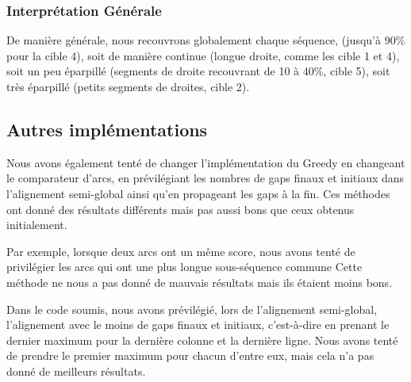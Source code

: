 \FloatBarrier


\subsubsection*{Interprétation Générale}

De manière générale, nous recouvrons globalement chaque séquence, (jusqu'à 90\%
pour la cible 4), soit de manière continue (longue droite, comme les cible 1 et
4), soit un peu éparpillé (segments de droite recouvrant de 10 à 40\%, cible 5),
soit très éparpillé (petits segments de droites, cible 2).

\subsection{Autres implémentations}

Nous avons également tenté de changer l'implémentation du Greedy en changeant
le comparateur d'arcs, en prévilégiant les nombres de gaps finaux et initiaux
dans l'alignement semi-global ainsi qu'en propageant les gaps à la fin. Ces
méthodes ont donné des résultats différents mais pas aussi bons que ceux obtenus
initialement.

Par exemple, lorsque deux arcs ont un même score, nous avons tenté de
privilégier les arcs qui ont une plus longue sous-séquence commune Cette méthode
ne nous a pas donné de mauvais résultats mais ils étaient moins bons.

Dans le code soumis, nous avons prévilégié, lors de l'alignement semi-global,
l'alignement avec le moins de gaps finaux et initiaux, c'est-à-dire en
prenant le dernier maximum pour la dernière colonne et la dernière ligne. Nous
avons tenté de prendre le premier maximum pour chacun d'entre eux, mais cela n'a
pas donné de meilleurs résultats.

